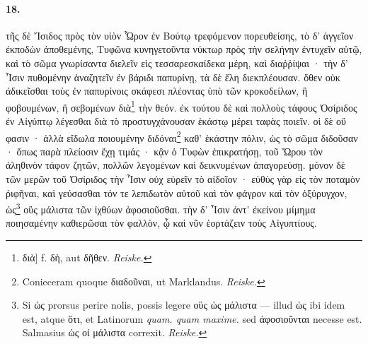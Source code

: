 \documentclass[a4paper, 11pt, oneside, polutonikogreek, german, landscape]{article}
\begin{document}
\paragraph{18.}
τῆς δὲ Ἴσιδος πρὸς τὸν υἱὸν Ὧρον ἐν Βούτῳ τρεφόμενον πορευθείσης, τὸ δ' ἀγγεῖον ἐκποδὼν ἀποθεμένης, Τυφῶνα κυνηγετοῦντα νύκτωρ πρὸς τὴν σελήνην ἐντυχεῖν αὐτῷ, καὶ τὸ σῶμα γνωρίσαντα διελεῖν εἰς τεσσαρεσκαίδεκα μέρη, καὶ διαῤῥίψαι · τὴν δ' Ἶσιν πυθομένην ἀναζητεῖν ἐν βάριδι παπυρίνῃ, τὰ δὲ ἕλη διεκπλέουσαν. ὅθεν οὐκ ἀδικεῖσθαι τοὺς ἐν παπυρίνοις σκάφεσι πλέοντας ὑπὸ τῶν κροκοδείλων, ἢ φοβουμένων, ἢ σεβομένων διὰ\footnote{διὰ] f. δὴ, aut δῆθεν. \emph{Reiske.}} τὴν θεόν. ἐκ τούτου δὲ καὶ πολλοὺς τάφους Ὀσίριδος ἐν Αἰγύπτῳ λέγεσθαι διὰ τὸ προστυγχάνουσαν ἑκάστῳ μέρει ταφὰς ποιεῖν. οἱ δὲ οὔ φασιν · ἀλλὰ εἴδωλα ποιουμένην διδόναι\footnote{Conieceram quoque διαδοῦναι, ut Marklandus. \emph{Reiske.}} καθ' ἑκάστην πόλιν, ὡς τὸ σῶμα διδοῦσαν · ὅπως παρὰ πλείοσιν ἔχῃ τιμάς · κᾂν ὁ Τυφὼν ἐπικρατήσῃ, τοῦ Ὥρου τὸν ἀληθινὸν τάφον ζητῶν, πολλῶν λεγομένων καὶ δεικνυμένων ἀπαγορεύσῃ. μόνον δὲ τῶν μερῶν τοῦ Ὀσίριδος τὴν Ἶσιν οὐχ εὑρεῖν τὸ αἰδοῖον · εὐθὺς γὰρ εἰς τὸν ποταμὸν ῥιφῆναι, καὶ γεύσασθαι τόν τε λεπιδωτὸν αὐτοῦ καὶ τὸν φάγρον καὶ τὸν ὀξύρυγχον, ὡς\footnote{Si ὡς prorsus perire nolis, possis legere οὓς ὡς μάλιστα --- illud ὡς ibi idem est, atque ὅτι, et Latinorum \emph{quam. quam maxime.} sed ἀφοσιοῦνται necesse est. Salmasius ὡς οἱ μάλιστα correxit. \emph{Reiske.}} οὓς μάλιστα τῶν ἰχθύων ἀφοσιοῦσθαι. τὴν δ' Ἶσιν ἀντ' ἐκείνου μίμημα ποιησαμένην καθιερῶσαι τὸν φαλλὸν, ᾧ καὶ νῦν ἑορτάζειν τοὺς Αἰγυπτίους.
\end{document}
